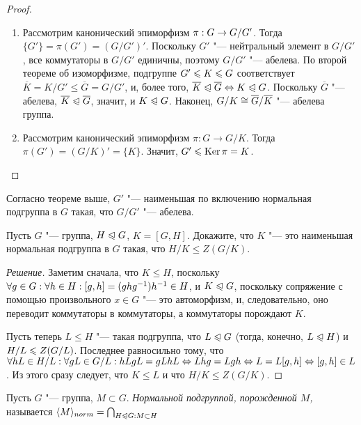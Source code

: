 \begin{proof}~
	\begin{enumerate}
		\item Рассмотрим канонический эпиморфизм $\pi: G \hm\to G / G'$. Тогда $\{G'\} = \pi(G') = (G / G')'$. Поскольку $G'$ "--- нейтральный элемент в $G / G'$, все коммутаторы в $G / G'$ единичны, поэтому $G / G'$ "--- абелева. По второй теореме об изоморфизме, подгруппе $G' \hm\le K \le G$ соответствует $\overline{K} = K / G' \le \overline{G} = G / G'$, и, более того, $\overline{K} \trianglelefteqslant \overline{G} \Leftrightarrow K \trianglelefteqslant G$. Поскольку $\overline{G}$ "--- абелева, $\overline{K} \trianglelefteqslant \overline{G}$, значит, и $K \trianglelefteqslant G$. Наконец, $G / K \hm\cong \overline{G} / \overline{K}$ "--- абелева группа.
		
		\item Рассмотрим канонический эпиморфизм $\pi: G \to G / K$. Тогда $\pi(G') = (G / K)' = \{K\}$. Значит, $G' \leqslant \operatorname{Ker}\pi = K$.
	\end{enumerate}
\end{proof}

\begin{note}
	Согласно теореме выше, $G'$ "--- наименьшая по включению нормальная подгруппа в $G$ такая, что $G / G'$ "--- абелева.
\end{note}

\begin{exercise}
	Пусть $G$ "--- группа, $H \trianglelefteqslant G$, $K = [G, H]$. Докажите, что $K$ "--- это наименьшая нормальная подгруппа в $G$ такая, что $H / K \le Z (G / K)$.
\end{exercise}

\begin{proof}[Решение]
	Заметим сначала, что $K \le H$, поскольку $\forall g \in G: \forall h \hm\in H: [g, h] = (ghg^{-1})h^{-1} \hm\in H$, и $K \trianglelefteqslant G$, поскольку сопряжение с помощью произвольного $x \in G$ "--- это автоморфизм, и, следовательно, оно переводит коммутаторы в коммутаторы, а коммутаторы порождают $K$.
	
	Пусть теперь $L \le H$ "--- такая подгруппа, что $L \trianglelefteqslant G$ (тогда, конечно, $L \trianglelefteqslant H$) и $H / L \hm\le Z(G / L)$. Последнее равносильно тому, что $\forall hL \in H / L: \forall gL \in G / L: hLgL = gLhL \hm\lra Lhg = Lgh \hm\lra L = L[g, h] \lra [g, h] \in L$. Из этого сразу следует, что $K \le L$ и что $H / K \le Z(G / K)$.
\end{proof}

\begin{definition}
	Пусть $G$ "--- группа, $M \subset G$. \textit{Нормальной подгруппой, порожденной $M$,} называется $\langle M\rangle_{norm} = \bigcap_{H \trianglelefteqslant G: M \subset H}$
\end{definition}

